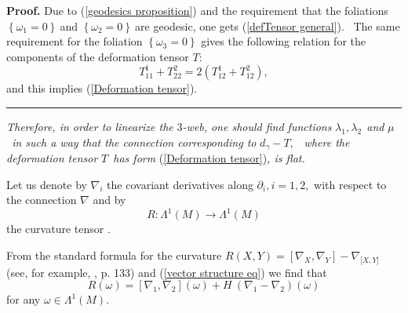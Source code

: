 \documentclass{article}
\newenvironment{proof}[1][Proof]{\noindent\textbf{#1.} }{\ \rule{0.5em}{0.5em}}
\begin{document}
\begin{proof}
Due to (\ref{geodesics proposition}) and the requirement that the foliations
$\left\{ \omega _{1}=0\right\} \ $and $\left\{ \omega _{2}=0\right\} \ $are
geodesic, one gets (\ref{defTensor general}). \ The same requirement for the
foliation $\left\{ \omega _{3}=0\right\} $ gives the following relation for
the components of the deformation tensor $T:$
\begin{equation*}
T_{11}^{1}+T_{22}^{2}=2(T_{12}^{1}+T_{12}^{2}),
\end{equation*}
and this implies (\ref{Deformation tensor}).
\end{proof}

\textit{Therefore, in order to linearize the }$3$\textit{-web, one should
find functions }$\lambda _{1},\lambda _{2}\ \ $\textit{and }$\mu $\textit{\
in such a way that the connection corresponding to }$d_{\gamma }-T,$\textit{%
\ where the deformation tensor }$T$\textit{\ has form }(\ref{Deformation
tensor})\textit{, is flat.}

Let us denote by $\nabla _{i}$ the covariant derivatives along $\partial
_{i},i=1,2,$ with respect to the connection $\nabla $ and by
\begin{equation*}
R:\Lambda ^{1}\left( M\right) \rightarrow \Lambda ^{1}\left( M\right)
\end{equation*}%
the curvature tensor .

From the standard formula for the curvature $R\left( X,Y\right) =[\nabla
_{X},\nabla _{Y}]-\nabla _{\lbrack X,Y]}$ (see, for example, \cite{KN 63},
p. 133) and (\ref{vector structure eq}) we find that
\begin{equation*}
R\left( \omega \right) =[\nabla _{1},\nabla _{2}]\left( \omega \right)
+H~(\nabla _{1}-\nabla _{2})\left( \omega \right)
\end{equation*}%
for any $\omega \in \Lambda ^{1}\left( M\right) .$
\end{document}
